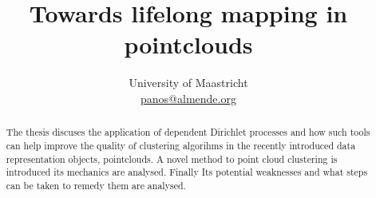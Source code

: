 \documentclass[twoside]{article}
\title{\vspace{-15mm}\fontsize{24pt}{10pt}\selectfont\textbf{{Towards lifelong mapping in pointclouds}}} %
\author{
\large
\normalsize University of Maastricht \\ %
\normalsize \href{mailto:john@smith.com}{panos@almende.org} %
\vspace{-5mm}
}
\date{}
\begin{document}
\maketitle %

\thispagestyle{fancy} %


\begin{abstract}

\noindent The thesis discuses the application of dependent Dirichlet processes and how such tools can help improve the quality of clustering algorihms in the recently introduced data representation objects, pointclouds. A novel method to point cloud clustering is introduced its mechanics are analysed. Finally Its potential weaknesses and what steps can be taken to remedy them are analysed.

\end{abstract}

\end{document}
